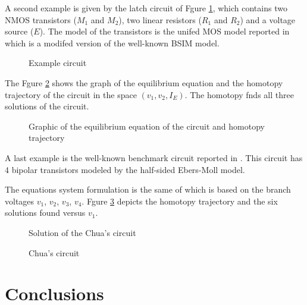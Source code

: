 \documentclass[conference]{IEEEtran}
\begin{document}
 A second example is given by the latch circuit of Fgure
 \ref{circu2}, which  contains
two NMOS transistors ($M_1$ and $M_2$), two linear resistors
($R_1$ and $R_2$) and a voltage source ($E$). The model of the transistors is the unifed MOS model
reported in \cite{homo_BSIM} which is a modifed version of the well-known
BSIM model.


\begin{figure}[hbtp]
\centerline{
\epsfxsize=90mm
}
\caption{Example circuit}
\label{circu2}
\end{figure}

The  Fgure \ref{circugraf} shows the graph of the equilibrium
equation and the homotopy trajectory of
the circuit in the space $(v_1,v_2,I_E)$. The homotopy fnds
all three solutions of the circuit.

\begin{figure}[hbtp]
\centerline{
\epsfxsize=90mm
}
\caption{Graphic of the equilibrium equation of the circuit and homotopy trajectory}
\label{circugraf}
\end{figure}



A last example is the well-known benchmark circuit reported in
\cite{homo_chua}. This circuit has 4 bipolar transistors modeled by the half-sided Ebers-Moll model.

The equations system formulation is the same of \cite{homo_chua} which is based
on the branch voltages $v_1$, $v_2$, $v_3$, $v_4$. Fgure \ref{chuaf} depicts
the homotopy trajectory and the six solutions found versus $v_1$.

\begin{figure}[hbt]
\centerline{
\epsfxsize=90mm
}
\caption{Solution of the Chua's circuit}
\label{chuaf}
\end{figure}


\begin{figure}[hbt]
\centerline{
\epsfxsize=90mm
}
\caption{Chua's circuit}
\label{chua}
\end{figure}


\section{Conclusions}
\end{document}
